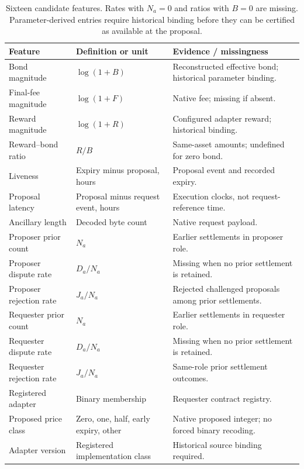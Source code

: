\begin{table}[!htbp]
\centering\tabstyle
\caption{Sixteen candidate features. Rates with $N_a=0$ and ratios with $B=0$ are missing. Parameter-derived entries require historical binding before they can be certified as available at the proposal.}
\label{tab:prediction_features}
\begin{tabularx}{\linewidth}{@{}L{.30\linewidth}L{.24\linewidth}Y@{}}
\toprule Feature & Definition or unit & Evidence / missingness \\ \midrule
Bond magnitude & $\log(1+B)$ & Reconstructed effective bond; historical parameter binding. \\
Final-fee magnitude & $\log(1+F)$ & Native fee; missing if absent. \\
Reward magnitude & $\log(1+R)$ & Configured adapter reward; historical binding. \\
Reward--bond ratio & $R/B$ & Same-asset amounts; undefined for zero bond. \\
Liveness & Expiry minus proposal, hours & Proposal event and recorded expiry. \\
Proposal latency & Proposal minus request event, hours & Execution clocks, not request-reference time. \\
Ancillary length & Decoded byte count & Native request payload. \\
Proposer prior count & $N_a$ & Earlier settlements in proposer role. \\
Proposer dispute rate & $D_a/N_a$ & Missing when no prior settlement is retained. \\
Proposer rejection rate & $J_a/N_a$ & Rejected challenged proposals among prior settlements. \\
Requester prior count & $N_a$ & Earlier settlements in requester role. \\
Requester dispute rate & $D_a/N_a$ & Missing when no prior settlement is retained. \\
Requester rejection rate & $J_a/N_a$ & Same-role prior settlement outcomes. \\
Registered adapter & Binary membership & Requester contract registry. \\
Proposed price class & Zero, one, half, early expiry, other & Native proposed integer; no forced binary recoding. \\
Adapter version & Registered implementation class & Historical source binding required. \\
\bottomrule
\end{tabularx}
\end{table}

